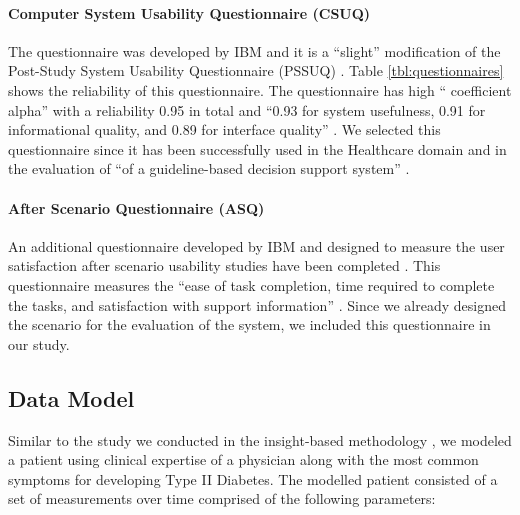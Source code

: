 \documentclass[twocolumn]{bmcart}%
\begin{document}
\paragraph*{Computer System Usability Questionnaire (CSUQ)} The questionnaire was developed by IBM and it is a ``slight'' modification of the Post-Study System Usability Questionnaire (PSSUQ) \cite{lewis1992psychometric}. Table \ref{tbl:questionnaires} shows the reliability of this questionnaire. The questionnaire has high `` coefficient alpha'' with a reliability 0.95 in total and ``0.93 for system usefulness, 0.91 for informational quality, and 0.89 for interface quality''  \cite{johnson2011ehr, lewis1995ibm, lewis1992psychometric}. We selected this questionnaire since it has been successfully used in the Healthcare domain \cite{johnson2011ehr, jaspers2008pre} and in the evaluation of ``of a guideline-based decision support system'' \cite{johnson2011ehr, goud2008subjective}.

\paragraph*{After Scenario Questionnaire (ASQ)} An additional questionnaire developed by IBM \cite{johnson2011ehr, lewis1995ibm, lewis1991psychometric} and designed to measure the user satisfaction after scenario usability studies have been completed \cite{johnson2011ehr, lewis1992psychometric, bangor2008empirical}. This questionnaire measures the ``ease of task completion, time required to complete the tasks, and satisfaction with support information'' \cite{johnson2011ehr}. Since we already designed the scenario for the evaluation of the system, we included this questionnaire in our study.

\subsection*{Data Model}

Similar to the study we conducted in the insight-based methodology \citep{EMBCLedNiem}, we modeled a patient using clinical expertise of a physician along with the most common symptoms for developing Type II Diabetes. The modelled patient consisted of a set of measurements over time comprised of the following parameters:
\end{document}
